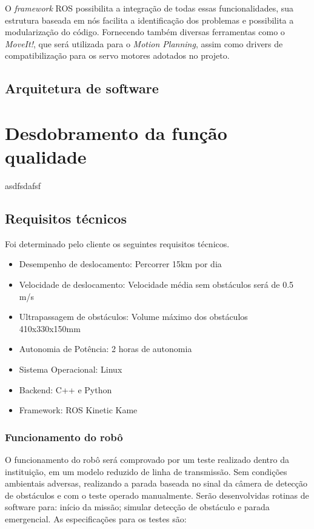 O \textit{framework} ROS possibilita a integração de todas essas funcionalidades, sua estrutura baseada em nós facilita a identificação dos problemas e possibilita a modularização do código. Fornecendo também diversas ferramentas como o \textit{MoveIt!}, que será utilizada para o \textit{Motion Planning}, assim como drivers de compatibilização para os servo motores adotados no projeto.

\subsection{Arquitetura de software}
\label{ssec:arqs}

\section{Desdobramento da função qualidade}
\label{sec:qfd}
asdfsdafsf

\subsection{Requisitos técnicos}
\label{ssec:reqt}
    Foi determinado pelo cliente os seguintes requisitos técnicos.
\begin{itemize}
	
\item Desempenho de deslocamento: Percorrer 15km por dia
\item Velocidade de deslocamento: Velocidade média sem obstáculos será de 0.5 m/s
\item Ultrapassagem de obstáculos: Volume máximo dos obstáculos 410x330x150mm
\item Autonomia de Potência: 2 horas de autonomia
\item Sistema Operacional: Linux
\item Backend: C++ e Python
\item Framework: ROS Kinetic Kame

\end{itemize}

\subsubsection{Funcionamento do robô}
O funcionamento do robô será comprovado por um teste realizado dentro da instituição, em um modelo reduzido de linha de transmissão. Sem condições ambientais adversas, realizando a parada baseada no sinal da câmera de detecção de obstáculos e com o teste operado manualmente. Serão desenvolvidas rotinas de software para: início da missão; simular detecção de obstáculo e parada emergencial. As especificações para os testes são:

